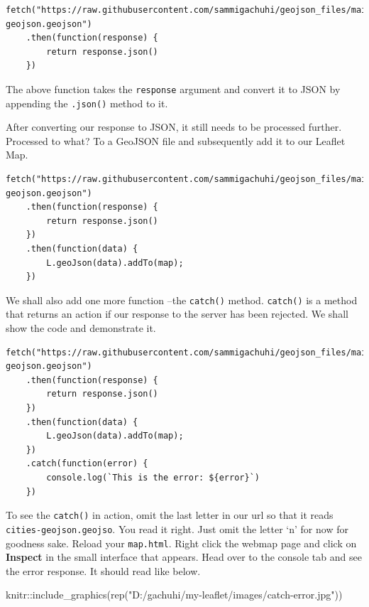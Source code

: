 \documentclass[
]{book}
\newenvironment{Shaded}{\begin{snugshade}}{\end{snugshade}}
\newcommand{\FunctionTok}[1]{\textcolor[rgb]{0.00,0.00,0.00}{#1}}
\newcommand{\NormalTok}[1]{#1}
\newcommand{\SpecialCharTok}[1]{\textcolor[rgb]{0.00,0.00,0.00}{#1}}
\newcommand{\StringTok}[1]{\textcolor[rgb]{0.31,0.60,0.02}{#1}}
\begin{document}
\begin{verbatim}
fetch("https://raw.githubusercontent.com/sammigachuhi/geojson_files/main/cities-geojson.geojson")
    .then(function(response) {
        return response.json()
    })
\end{verbatim}

The above function takes the \texttt{response} argument and convert it to JSON by appending the \texttt{.json()} method to it.

After converting our response to JSON, it still needs to be processed further. Processed to what? To a GeoJSON file and subsequently add it to our Leaflet Map.

\begin{verbatim}
fetch("https://raw.githubusercontent.com/sammigachuhi/geojson_files/main/cities-geojson.geojson")
    .then(function(response) {
        return response.json()
    })
    .then(function(data) {
        L.geoJson(data).addTo(map);
    })
\end{verbatim}

We shall also add one more function --the \texttt{catch()} method. \texttt{catch()} is a method that returns an action if our response to the server has been rejected. We shall show the code and demonstrate it.

\begin{verbatim}
fetch("https://raw.githubusercontent.com/sammigachuhi/geojson_files/main/cities-geojson.geojson")
    .then(function(response) {
        return response.json()
    })
    .then(function(data) {
        L.geoJson(data).addTo(map);
    })
    .catch(function(error) {
        console.log(`This is the error: ${error}`)
    })
\end{verbatim}

To see the \texttt{catch()} in action, omit the last letter in our url so that it reads \texttt{cities-geojson.geojso}. You read it right. Just omit the letter `n' for now for goodness sake. Reload your \texttt{map.html}. Right click the webmap page and click on \textbf{Inspect} in the small interface that appears. Head over to the console tab and see the error response. It should read like below.

\begin{Shaded}
\begin{Highlighting}[]
\NormalTok{knitr}\SpecialCharTok{::}\FunctionTok{include\_graphics}\NormalTok{(}\FunctionTok{rep}\NormalTok{(}\StringTok{"D:/gachuhi/my{-}leaflet/images/catch{-}error.jpg"}\NormalTok{))}
\end{Highlighting}
\end{Shaded}
\end{document}
